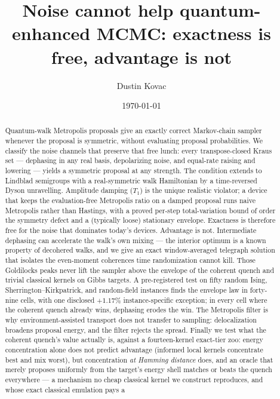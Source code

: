 \documentclass[aps,prx,reprint,floatfix,amsmath,amssymb,amsfonts]{revtex4-2}
\begin{document}
\title{Noise cannot help quantum-enhanced MCMC: exactness is free, advantage is not}

\author{Dustin Kovac}

\date{\today}

\begin{abstract}
Quantum-walk Metropolis proposals give an exactly correct Markov-chain
sampler whenever the proposal is symmetric, without evaluating proposal
probabilities. We classify the noise channels that preserve that free
lunch: every transpose-closed Kraus set --- dephasing in any real basis,
depolarizing noise, and equal-rate raising and lowering --- yields a
symmetric proposal at any strength. The condition extends to Lindblad
semigroups with a real-symmetric walk Hamiltonian by a time-reversed
Dyson unravelling. Amplitude damping ($T_1$) is the unique realistic
violator; a device that keeps the evaluation-free Metropolis ratio on a
damped proposal runs naive Metropolis rather than Hastings, with a
proved per-step total-variation bound of order the symmetry defect and a
(typically loose) stationary envelope. Exactness is therefore free for
the noise that dominates today's devices. Advantage is not. Intermediate
dephasing can accelerate the walk's own mixing --- the interior optimum
is a known property of decohered walks, and we give an exact
window-averaged telegraph solution that isolates the even-moment
coherences time randomization cannot kill. Those Goldilocks peaks never
lift the sampler above the envelope of the coherent quench and trivial
classical kernels on Gibbs targets. A pre-registered test on fifty
random Ising, Sherrington--Kirkpatrick, and random-field instances finds
the envelope law in forty-nine cells, with one disclosed $+1.17\%$
instance-specific exception; in every cell where the coherent quench
already wins, dephasing erodes the win. The Metropolis filter is why
environment-assisted transport does not transfer to sampling:
delocalization broadens proposal energy, and the filter rejects the
spread. Finally we test what the
coherent quench's value actually is, against a fourteen-kernel
exact-tier zoo: energy concentration alone does not predict advantage
(informed local kernels concentrate best and mix worst), but
concentration \emph{at Hamming distance} does, and an oracle that
merely proposes uniformly from the target's energy shell matches or
beats the quench everywhere --- a mechanism no cheap classical kernel
we construct reproduces, and whose exact classical emulation pays a

\end{abstract}
\end{document}
